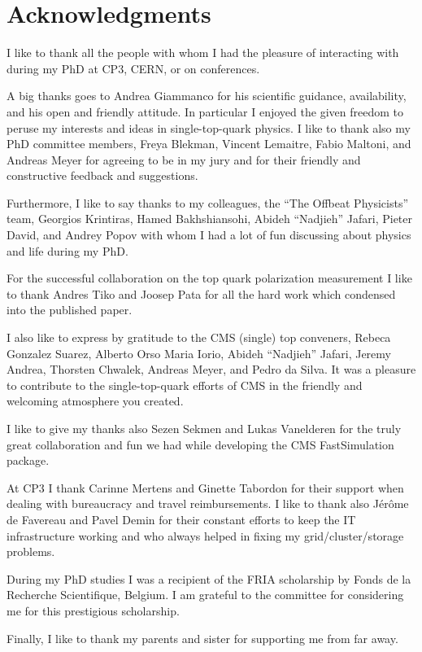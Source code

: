 \chapter*{Acknowledgments}

I like to thank all the people with whom I had the pleasure of interacting with during my PhD at CP3, CERN, or on conferences.

A big thanks goes to Andrea Giammanco for his scientific guidance, availability, and his open and friendly attitude. In particular I enjoyed the given freedom to peruse my interests and ideas in single-top-quark physics. I like to thank also my PhD committee members, Freya Blekman, Vincent Lemaitre, Fabio Maltoni, and Andreas Meyer for agreeing to be in my jury and for their friendly and constructive feedback and suggestions.

Furthermore, I like to say thanks to my colleagues, the ``The Offbeat Physicists'' team, Georgios Krintiras, Hamed Bakhshiansohi, Abideh ``Nadjieh'' Jafari, Pieter David, and Andrey Popov with whom I had a lot of fun discussing about physics and life during my PhD.

For the successful collaboration on the top quark polarization measurement I like to thank Andres Tiko and Joosep Pata for all the hard work which condensed into the published paper.

I also like to express by gratitude to the CMS (single) top conveners, Rebeca Gonzalez Suarez, Alberto Orso Maria Iorio, Abideh ``Nadjieh'' Jafari, Jeremy Andrea, Thorsten Chwalek, Andreas Meyer, and Pedro da Silva. It was a pleasure to contribute to the single-top-quark efforts of CMS in the friendly and welcoming atmosphere you created.

I like to give my thanks also Sezen Sekmen and Lukas Vanelderen for the truly great collaboration and fun we had while developing the CMS FastSimulation package.

At CP3 I thank Carinne Mertens and Ginette Tabordon for their support when dealing with bureaucracy and travel reimbursements. I like to thank also J\'er\^ome de Favereau and Pavel Demin for their constant efforts to keep the IT infrastructure working and who always helped in fixing my grid/cluster/storage problems.

During my PhD studies I was a recipient of the FRIA scholarship by Fonds de la Recherche Scientifique, Belgium. I am grateful to the committee for considering me for this prestigious scholarship.

Finally, I like to thank my parents and sister for supporting me from far away.
